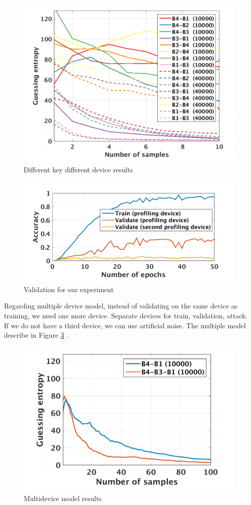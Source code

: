 \begin{figure}
    \centering
    \includegraphics[scale=0.5]{images/chapter8/different_key_different_device.PNG}
    \caption{Different key different device results}
    \label{fig:different_key_differnet_device}
\end{figure}

\begin{figure}
    \centering
    \includegraphics[scale=0.5]{images/chapter8/validation.PNG}
    \caption{Validation for our experiment}
    \label{fig:validation}
\end{figure}

Regarding multiple device model, instead of validating on the same device as training, we need
one more device. Separate devices for train, validation, attack. If we do not have a third device, we can use artificial noise. The multiple model describe in Figure \ref{fig:multidevice} .
 

\begin{figure}
    \centering
    \includegraphics[scale=0.5]{images/chapter8/multidevice.PNG}
    \caption{Multidevice model results}
    \label{fig:multidevice}
\end{figure}
